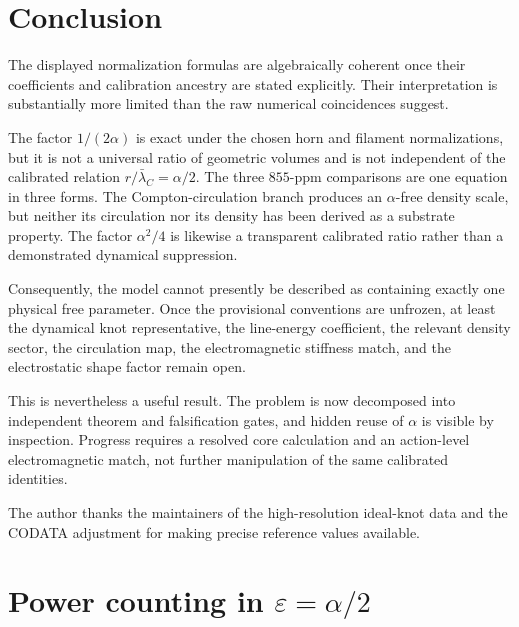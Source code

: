 \documentclass[aps,pre,preprint,notitlepage,nofootinbib,superscriptaddress]{revtex4-2}
\newcommand{\lC}{\bar\lambda_C}
\begin{document}
\section{Conclusion}
\label{sec:conclusion}

The displayed normalization formulas are algebraically coherent once their coefficients and calibration ancestry are stated explicitly.  Their interpretation is substantially more limited than the raw numerical coincidences suggest.

The factor \(1/(2\alpha)\) is exact under the chosen horn and filament normalizations, but it is not a universal ratio of geometric volumes and is not independent of the calibrated relation \(r/\lC=\alpha/2\).  The three \(855\)-ppm comparisons are one equation in three forms.  The Compton-circulation branch produces an \(\alpha\)-free density scale, but neither its circulation nor its density has been derived as a substrate property.  The factor \(\alpha^2/4\) is likewise a transparent calibrated ratio rather than a demonstrated dynamical suppression.

Consequently, the model cannot presently be described as containing exactly one physical free parameter.  Once the provisional conventions are unfrozen, at least the dynamical knot representative, the line-energy coefficient, the relevant density sector, the circulation map, the electromagnetic stiffness match, and the electrostatic shape factor remain open.

This is nevertheless a useful result.  The problem is now decomposed into independent theorem and falsification gates, and hidden reuse of \(\alpha\) is visible by inspection.  Progress requires a resolved core calculation and an action-level electromagnetic match, not further manipulation of the same calibrated identities.

\begin{acknowledgments}
The author thanks the maintainers of the high-resolution ideal-knot data and the CODATA adjustment for making precise reference values available.
\end{acknowledgments}

\appendix

\section{Power counting in \texorpdfstring{\(\varepsilon=\alpha/2\)}{epsilon}}
\label{app:powers}
\end{document}
